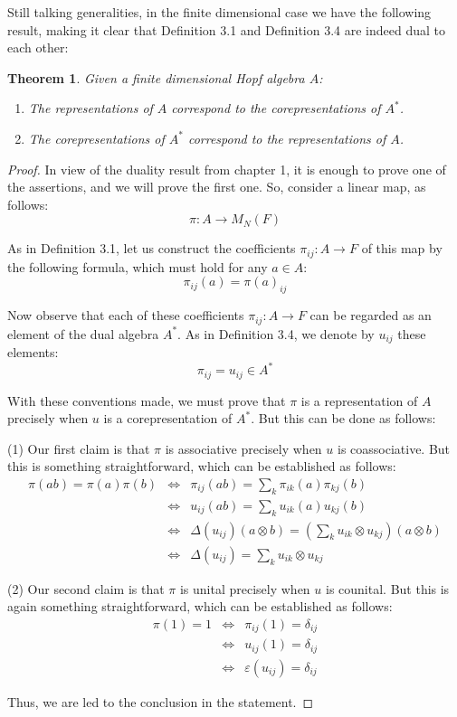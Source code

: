 \documentclass[12pt]{amsbook}
\newtheorem{theorem}{Theorem}[chapter]
\begin{document}
Still talking generalities, in the finite dimensional case we have the following result, making it clear that Definition 3.1 and Definition 3.4 are indeed dual to each other:

\begin{theorem}
Given a finite dimensional Hopf algebra $A$:
\begin{enumerate}
\item The representations of $A$ correspond to the corepresentations of $A^*$.

\item The corepresentations of $A^*$ correspond to the representations of $A$.
\end{enumerate}
\end{theorem}

\begin{proof}
In view of the duality result from chapter 1, it is enough to prove one of the assertions, and we will prove the first one. So, consider a linear map, as follows:
$$\pi:A\to M_N(F)$$

As in Definition 3.1, let us construct the coefficients $\pi_{ij}:A\to F$ of this map by the following formula, which must hold for any $a\in A$:
$$\pi_{ij}(a)=\pi(a)_{ij}$$

Now observe that each of these coefficients $\pi_{ij}:A\to F$ can be regarded as an element of the dual algebra $A^*$. As in Definition 3.4, we denote by $u_{ij}$ these elements:
$$\pi_{ij}=u_{ij}\in A^*$$

With these conventions made, we must prove that $\pi$ is a representation of $A$ precisely when $u$ is a corepresentation of $A^*$. But this can be done as follows:

\medskip

(1) Our first claim is that $\pi$ is associative precisely when $u$ is coassociative. But this is something straightforward, which can be established as follows:
\begin{eqnarray*}
\pi(ab)=\pi(a)\pi(b)
&\iff&\pi_{ij}(ab)=\sum_k\pi_{ik}(a)\pi_{kj}(b)\\
&\iff&u_{ij}(ab)=\sum_ku_{ik}(a)u_{kj}(b)\\
&\iff&\Delta(u_{ij})(a\otimes b)=\left(\sum_ku_{ik}\otimes u_{kj}\right)(a\otimes b)\\
&\iff&\Delta(u_{ij})=\sum_ku_{ik}\otimes u_{kj}
\end{eqnarray*}

(2) Our second claim is that $\pi$ is unital precisely when $u$ is counital. But this is again something straightforward, which can be established as follows:
\begin{eqnarray*}
\pi(1)=1
&\iff&\pi_{ij}(1)=\delta_{ij}\\
&\iff&u_{ij}(1)=\delta_{ij}\\
&\iff&\varepsilon(u_{ij})=\delta_{ij}
\end{eqnarray*}

Thus, we are led to the conclusion in the statement.
\end{proof}
\end{document}
